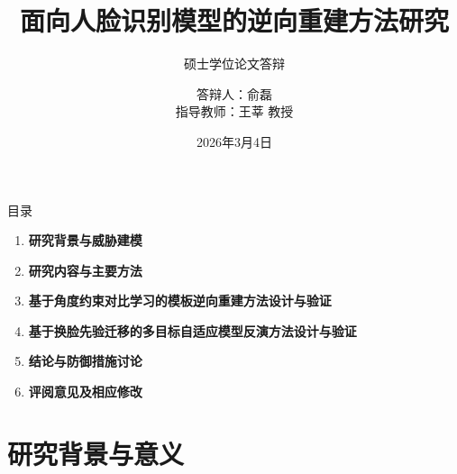 \documentclass[aspectratio=169,12pt]{beamer}
\title[面向人脸识别模型的逆向重建方法研究]{面向人脸识别模型的逆向重建方法研究}
\subtitle{硕士学位论文答辩}
\author[俞磊]{答辩人：俞磊 \\ \smallskip \small 指导教师：王莘 教授}
\institute[HIT]{哈尔滨工业大学\\网络空间安全学院}
\date{2026年3月4日}
\renewcommand{\textbf}[1]{\textcolor{hitblue}{\bfseries #1}}
\begin{document}
\begin{frame}[plain]
\titlepage
\end{frame} %

\begin{frame}{目录}
\begin{enumerate}
  \item \textbf{研究背景与威胁建模}

  \item \textbf{研究内容与主要方法}

  \item \textbf{基于角度约束对比学习的模板逆向重建方法设计与验证}

  \item \textbf{基于换脸先验迁移的多目标自适应模型反演方法设计与验证}

  \item \textbf{结论与防御措施讨论}

  \item \textbf{评阅意见及相应修改}
\end{enumerate}
\end{frame} %

\section{研究背景与意义}
\end{document}
